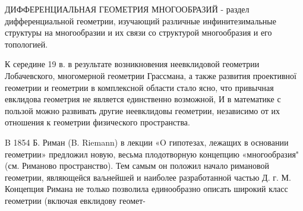 \documentclass[10pt]{article}
\begin{document}
ДИФФЕРЕНЦИАЛЬНАЯ ГЕОМЕТРИЯ МНОГООБРАЗИЙ - раздел дифференциальной геометрии, изучающий различные инфинитезимальные структуры на многообразии и их связи со структурой многообразия и его топологией.



К середине 19 в. в результате возникновения неевклидовой геометрии Лобачевского, многомерной геометрии Грассмана, а также развития проективної геометрии и геометрии в комплексной области стало ясно, что привычная евклидова геометрия не является единственно возможной, И в математике с пользой можно развивать другие неевклидовы геометрии, независимо от их отношения к геометрии физического пространства.



B 1854 Б. Риман (B. Riemann) в лекции «O гипотезах, лежащих в основании геометрии» предложил новую, весьма плодотворную концепцию «многообразия" (см. Риманово пространство). Тем самым он положил начало римановой геометрии, являющейся ваљнейшей и наиболее разработанной частью Д. г. М. Концепция Римана не только позволила единообразно описать широкий класс геометрии (включая евклидову геомет-
\end{document}
